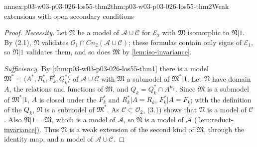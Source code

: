 \begin{annexitem}{annex:p03-w03-p03-026-los55-thm2}{thm:p03-w03-p03-026-los55-thm2}{Weak extensions with open secondary conditions}
\begin{proof}
\emph{Necessity.}  Let \(\mathfrak N\) be a model of \(\mathcal A\cup\mathcal C\)
for \(\mathcal E_2\) with \(\mathfrak M\) isomorphic to \(\mathfrak N|1\).  By
(2.1), \(\mathfrak N\) validates
\(\mathcal O_1\cap\mathit{Cn}_2(\mathcal A\cup\mathcal C)\); these formulas
contain only signs of \(\mathcal E_1\), so \(\mathfrak N|1\) validates them,
and so does \(\mathfrak M\) by \cref{lem:iso-invariance}.

\emph{Sufficiency.}  By \cref{thm:p03-w03-p03-026-los55-thm1} there is a model
\(\mathfrak M^*=\langle A^*,R^*_k,F^*_k,Q^*_k\rangle\) of
\(\mathcal A\cup\mathcal C\) with \(\mathfrak M\) a submodel of
\(\mathfrak M^*|1\).  Let \(\mathfrak N\) have domain \(A\), the relations and
functions of \(\mathfrak M\), and \(Q_k=Q^*_k\cap A^{\mu_k}\).  Since
\(\mathfrak M\) is a submodel of \(\mathfrak M^*|1\), \(A\) is closed under the
\(F^*_k\) and \(R^*_k|A=R_k\), \(F^*_k|A=F_k\); with the definition of the
\(Q_k\), \(\mathfrak N\) is a submodel of \(\mathfrak M^*\).  As
\(\mathcal C\subset\mathcal O_2\), (3.1) shows that \(\mathfrak N\) is a model
of \(\mathcal C\).  Also \(\mathfrak N|1=\mathfrak M\), which is a model of
\(\mathcal A\), so \(\mathfrak N\) is a model of \(\mathcal A\)
(\cref{lem:reduct-invariance}).  Thus \(\mathfrak N\) is a weak extension of the
second kind of \(\mathfrak M\), through the identity map, and a model of
\(\mathcal A\cup\mathcal C\).
\end{proof}
\end{annexitem}

